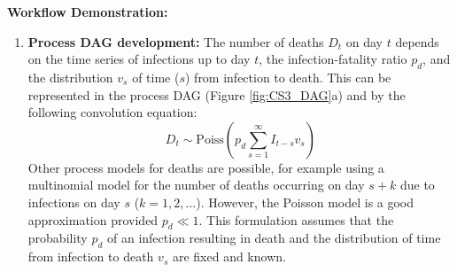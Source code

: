 \documentclass{article}
\begin{document}
\textbf{Workflow Demonstration:}
\begin{enumerate}
    \item \textbf{Process DAG development:} The number of deaths $D_t$ on day $t$ depends on the time series of infections up to day $t$, the infection-fatality ratio $p_d$, and the distribution $v_s$ of time ($s$) from infection to death. This can be represented in the process DAG (Figure \ref{fig:CS3_DAG}a) and by the following convolution equation:
    \begin{equation} \label{eq:deaths}
        D_t \sim \mathrm{Poiss}\left(p_d \sum_{s=1}^\infty I_{t-s}v_s \right)
    \end{equation}
    Other process models for deaths are possible, for example using a multinomial model for the number of deaths occurring on day $s+k$ due to infections on day $s$ ($k=1,2,\ldots$). However, the Poisson model is a good approximation provided $p_d\ll 1$. This formulation assumes that the probability $p_d$ of an infection resulting in death and the distribution of time from infection to death $v_s$ are fixed and known.
    

\end{enumerate}
\end{document}
